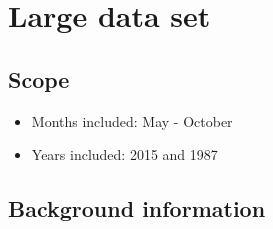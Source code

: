 \documentclass[A4paper, 11pt]{article}
\begin{document}
	\pagebreak
	
	\section{Large data set}
	\subsection{Scope}
	\begin{itemize}
		\item Months included: May - October
		\item Years included: 2015 and 1987
	\end{itemize}
	\subsection{Background information}
\end{document}
